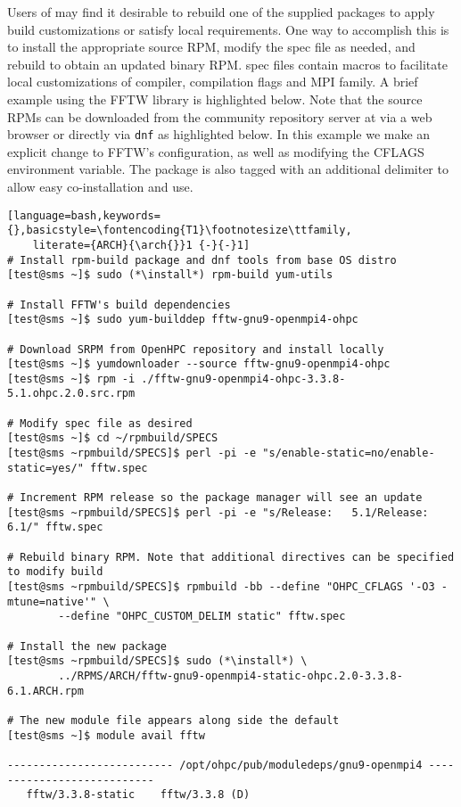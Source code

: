 Users of \OHPC{} may find it desirable to rebuild one of the supplied packages
to apply build customizations or satisfy local requirements. One way to
accomplish this is to install the appropriate source RPM, modify the spec file
as needed, and rebuild to obtain an updated binary RPM. \OHPC{} spec files
contain macros to facilitate local customizations of compiler, compilation
flags and MPI family. A brief example using
the FFTW library is highlighted below.  Note that the source RPMs can be downloaded from the
community repository server at \href{http://repos.openhpc.community}
{\color{blue}{http://repos.openhpc.community}} via a web browser or directly
via \texttt{dnf} as highlighted below. In this example we make an explicit
change to FFTW's configuration, as well as modifying the CFLAGS environment
variable. The package is also tagged with an additional delimiter to allow easy
co-installation and use. 

\begin{lstlisting}[language=bash,keywords={},basicstyle=\fontencoding{T1}\footnotesize\ttfamily,
    literate={ARCH}{\arch{}}1 {-}{-}1]
# Install rpm-build package and dnf tools from base OS distro
[test@sms ~]$ sudo (*\install*) rpm-build yum-utils

# Install FFTW's build dependencies
[test@sms ~]$ sudo yum-builddep fftw-gnu9-openmpi4-ohpc

# Download SRPM from OpenHPC repository and install locally
[test@sms ~]$ yumdownloader --source fftw-gnu9-openmpi4-ohpc
[test@sms ~]$ rpm -i ./fftw-gnu9-openmpi4-ohpc-3.3.8-5.1.ohpc.2.0.src.rpm

# Modify spec file as desired
[test@sms ~]$ cd ~/rpmbuild/SPECS
[test@sms ~rpmbuild/SPECS]$ perl -pi -e "s/enable-static=no/enable-static=yes/" fftw.spec

# Increment RPM release so the package manager will see an update
[test@sms ~rpmbuild/SPECS]$ perl -pi -e "s/Release:   5.1/Release:   6.1/" fftw.spec

# Rebuild binary RPM. Note that additional directives can be specified to modify build
[test@sms ~rpmbuild/SPECS]$ rpmbuild -bb --define "OHPC_CFLAGS '-O3 -mtune=native'" \
        --define "OHPC_CUSTOM_DELIM static" fftw.spec

# Install the new package
[test@sms ~rpmbuild/SPECS]$ sudo (*\install*) \
        ../RPMS/ARCH/fftw-gnu9-openmpi4-static-ohpc.2.0-3.3.8-6.1.ARCH.rpm

# The new module file appears along side the default
[test@sms ~]$ module avail fftw

-------------------------- /opt/ohpc/pub/moduledeps/gnu9-openmpi4 ---------------------------
   fftw/3.3.8-static    fftw/3.3.8 (D)
\end{lstlisting}
